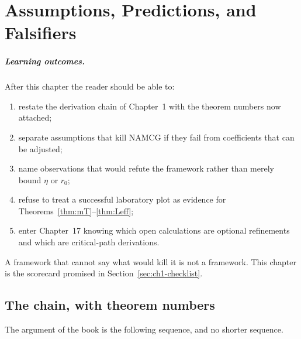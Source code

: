 \chapter[Falsifiers]{Assumptions, Predictions, and Falsifiers}
\label{ch:falsifiers}

\paragraph{Learning outcomes.}
After this chapter the reader should be able to:
\begin{enumerate}
  \item restate the derivation chain of Chapter~1 with the theorem
        numbers now attached;
  \item separate assumptions that kill NAMCG if they fail from
        coefficients that can be adjusted;
  \item name observations that would refute the framework rather
        than merely bound \(\eta\) or \(r_0\);
  \item refuse to treat a successful laboratory plot as evidence
        for Theorems~\ref{thm:mT}--\ref{thm:Leff};
  \item enter Chapter~17 knowing which open calculations are
        optional refinements and which are critical-path
        derivations.
\end{enumerate}

A framework that cannot say what would kill it is not a framework.
This chapter is the scorecard promised in Section~\ref{sec:ch1-checklist}.

\section{The chain, with theorem numbers}
\label{sec:ch16-chain}

The argument of the book is the following sequence, and no shorter
sequence.

